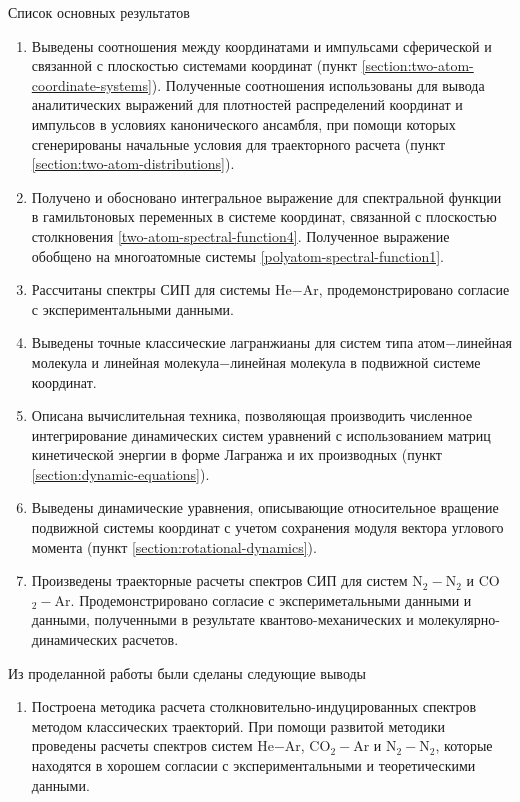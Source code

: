 Список основных результатов
\begin{enumerate}
    \item Выведены соотношения между координатами и импульсами сферической и связанной с плоскостью системами координат (пункт \ref{section:two-atom-coordinate-systems}). Полученные соотношения использованы для вывода  аналитических выражений для плотностей распределений координат и импульсов в условиях канонического ансамбля, при помощи которых сгенерированы начальные условия для траекторного расчета (пункт \ref{section:two-atom-distributions}).
    \item Получено и обосновано интегральное выражение для спектральной функции в гамильтоновых переменных в системе координат, связанной с плоскостью столкновения \eqref{two-atom-spectral-function4}. Полученное выражение обобщено на многоатомные системы \eqref{polyatom-spectral-function1}. 
    \item Рассчитаны спектры СИП для системы He$-$Ar, продемонстрировано согласие с экспериментальными данными. 
    \item Выведены точные классические лагранжианы для систем типа атом$-$линейная молекула и линейная молекула$-$линейная молекула в подвижной системе координат.
    \item Описана вычислительная техника, позволяющая производить численное интегрирование динамических систем уравнений с использованием матриц кинетической энергии в форме Лагранжа и их производных (пункт \ref{section:dynamic-equations}).
    \item Выведены динамические уравнения, описывающие относительное вращение подвижной системы координат с учетом сохранения модуля вектора углового момента (пункт \ref{section:rotational-dynamics}).
    \item Произведены траекторные расчеты спектров СИП для систем N$_2-$N$_2$ и CO$_2-$Ar. Продемонстрировано согласие с экспериметальными данными и данными, полученными в результате квантово-механических и молекулярно-динамических расчетов.
\end{enumerate}

Из проделанной работы были сделаны следующие выводы
\begin{enumerate}
    \item Построена методика расчета столкновительно-индуцированных спектров методом классических траекторий. При помощи развитой методики проведены расчеты спектров систем He$-$Ar, CO$_2-$Ar и N$_2-$N$_2$, которые находятся в хорошем согласии с экспериментальными и теоретическими данными.
\end{enumerate}
